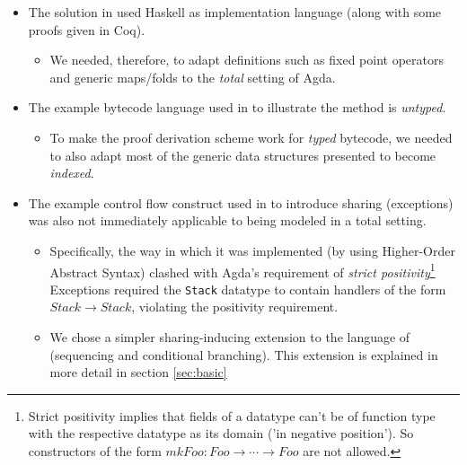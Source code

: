 \documentclass[a4paper]{article}
\begin{document}
        \begin{itemize}
            \item The solution in \cite{compiler-correctness-structured-graphs}
                used Haskell as implementation language (along with some proofs given in Coq).
                \begin{itemize}
                    \item We needed, therefore, to adapt definitions such as fixed point operators and generic
                        maps/folds to the \emph{total} setting of Agda.
                \end{itemize}

            \item The example bytecode language used in \cite{compiler-correctness-structured-graphs}
                to illustrate the method is \emph{untyped}.
                \begin{itemize}
                    \item To make the proof derivation scheme work for \emph{typed} bytecode,
                        we needed to also adapt most of the generic data structures presented to become \emph{indexed}.
                \end{itemize}

            \item The example control flow construct used in \cite{compiler-correctness-structured-graphs}
                to introduce sharing (exceptions) was also not immediately applicable to being
                modeled in a total setting.
                \begin{itemize}
                    \item Specifically, the way in which it was implemented (by using Higher-Order Abstract Syntax)
                        clashed with Agda's requirement of \emph{strict positivity}\footnote{Strict positivity implies
                        that fields of a datatype can't be of function type with the respective datatype as its 
                        domain ('in negative position'). So constructors of the form $mkFoo : Foo \to \cdots \to Foo$
                        are not allowed.} Exceptions required the \texttt{Stack} datatype to contain handlers of the form 
                        $Stack \to Stack$, violating the positivity requirement.
                        
                    \item We chose a simpler sharing-inducing extension to the language of
                        \cite{typed-stack-safe-compiler} (sequencing and conditional branching).
                        This extension is explained in more detail in section \ref{sec:basic}
                \end{itemize}
        \end{itemize}
        
\end{document}
